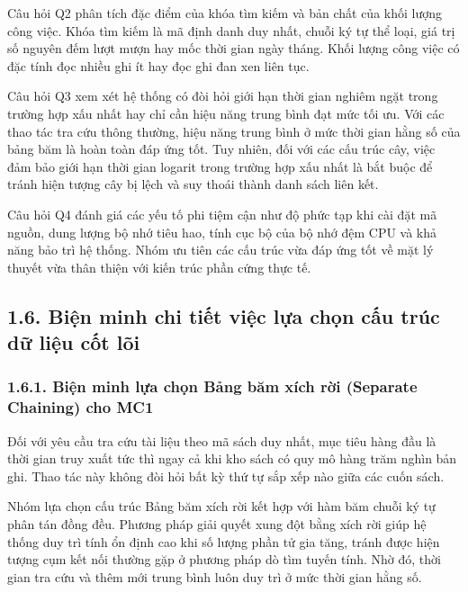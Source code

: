 \documentclass[14pt,a4paper]{extarticle}
\begin{document}
Câu hỏi Q2 phân tích đặc điểm của khóa tìm kiếm và bản chất của khối lượng công việc. Khóa tìm kiếm là mã định danh duy nhất, chuỗi ký tự thể loại, giá trị số nguyên đếm lượt mượn hay mốc thời gian ngày tháng. Khối lượng công việc có đặc tính đọc nhiều ghi ít hay đọc ghi đan xen liên tục.

Câu hỏi Q3 xem xét hệ thống có đòi hỏi giới hạn thời gian nghiêm ngặt trong trường hợp xấu nhất hay chỉ cần hiệu năng trung bình đạt mức tối ưu. Với các thao tác tra cứu thông thường, hiệu năng trung bình ở mức thời gian hằng số của bảng băm là hoàn toàn đáp ứng tốt. Tuy nhiên, đối với các cấu trúc cây, việc đảm bảo giới hạn thời gian logarit trong trường hợp xấu nhất là bắt buộc để tránh hiện tượng cây bị lệch và suy thoái thành danh sách liên kết.

Câu hỏi Q4 đánh giá các yếu tố phi tiệm cận như độ phức tạp khi cài đặt mã nguồn, dung lượng bộ nhớ tiêu hao, tính cục bộ của bộ nhớ đệm CPU và khả năng bảo trì hệ thống. Nhóm ưu tiên các cấu trúc vừa đáp ứng tốt về mặt lý thuyết vừa thân thiện với kiến trúc phần cứng thực tế.

\subsection*{1.6. Biện minh chi tiết việc lựa chọn cấu trúc dữ liệu cốt lõi}

\subsubsection*{1.6.1. Biện minh lựa chọn Bảng băm xích rời (Separate Chaining) cho MC1}

Đối với yêu cầu tra cứu tài liệu theo mã sách duy nhất, mục tiêu hàng đầu là thời gian truy xuất tức thì ngay cả khi kho sách có quy mô hàng trăm nghìn bản ghi. Thao tác này không đòi hỏi bất kỳ thứ tự sắp xếp nào giữa các cuốn sách.

Nhóm lựa chọn cấu trúc Bảng băm xích rời kết hợp với hàm băm chuỗi ký tự phân tán đồng đều. Phương pháp giải quyết xung đột bằng xích rời giúp hệ thống duy trì tính ổn định cao khi số lượng phần tử gia tăng, tránh được hiện tượng cụm kết nối thường gặp ở phương pháp dò tìm tuyến tính. Nhờ đó, thời gian tra cứu và thêm mới trung bình luôn duy trì ở mức thời gian hằng số.
\end{document}
